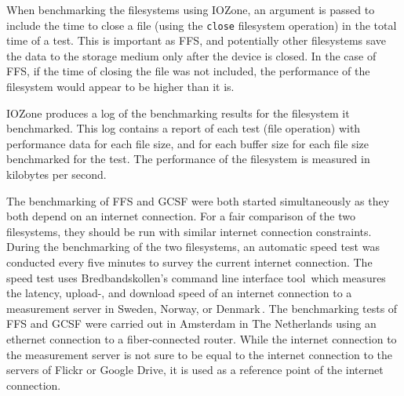 When benchmarking the filesystems using IOZone, an argument is passed to include the time to close a file (using the \texttt{close} filesystem operation) in the total time of a test. This is important as \gls{FFS}, and potentially other filesystems save the data to the storage medium only after the device is closed. In the case of \gls{FFS}, if the time of closing the file was not included, the performance of the filesystem would appear to be higher than it is.

IOZone produces a log of the benchmarking results for the filesystem it benchmarked. This log contains a report of each test (file operation) with performance data for each file size, and for each buffer size for each file size benchmarked for the test. The performance of the filesystem is measured in kilobytes per second.

The benchmarking of \gls{FFS} and \gls{GCSF} were both started simultaneously as they both depend on an internet connection. For a fair comparison of the two filesystems, they should be run with similar internet connection constraints. During the benchmarking of the two filesystems, an automatic speed test was conducted every five minutes to survey the current internet connection. The speed test uses Bredbandskollen's command line interface tool\,\cite{internetstiftelsenBredbandskollenCLIBredbandskollen} which measures the latency, upload-, and download speed of an internet connection to a measurement server in Sweden, Norway, or Denmark\,\cite{internetstiftelsenMerOmBredbandskollen}. The benchmarking tests of \gls{FFS} and \gls{GCSF} were carried out in Amsterdam in The Netherlands using an ethernet connection to a \mbox{fiber-connected} router. While the internet connection to the measurement server is not sure to be equal to the internet connection to the servers of Flickr or Google Drive, it is used as a reference point of the internet connection.